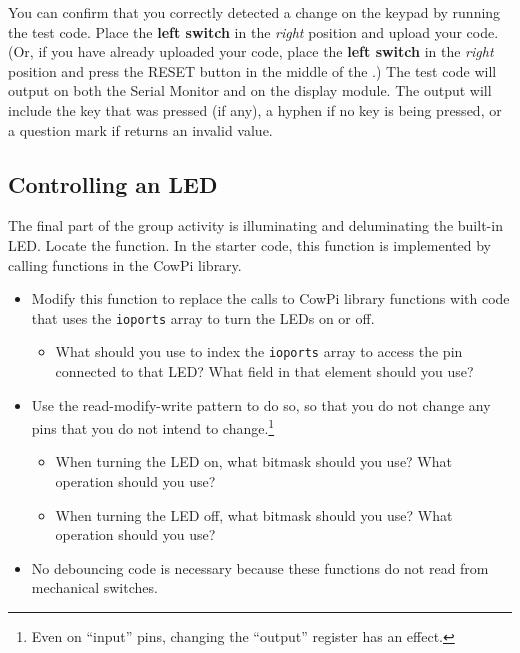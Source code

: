 You can confirm that you correctly detected a change on the keypad by running the test code.
Place the \textbf{left switch} in the \textit{right} position and upload your code.
(Or, if you have already uploaded your code, place the \textbf{left switch} in the \textit{right} position and press the RESET button in the middle of the \developmentboard.)
The test code will output on both the Serial Monitor and on the display module.
The output will include the key that was pressed (if any), a hyphen if no key is being pressed, or a question mark if  returns an invalid value.


\subsection{Controlling an LED}

The final part of the group activity is illuminating and deluminating the built-in LED\@.
Locate the  function.
In the starter code, this function is implemented by calling functions in the CowPi library.

\begin{itemize}
    \item Modify this function to replace the calls to CowPi library functions with code that uses the \lstinline{ioports} array to turn the LEDs on or off.
        \begin{itemize}
            \item What should you use to index the \lstinline{ioports} array to access the pin connected to that LED?
                What field in that element should you use?
        \end{itemize}
    \item Use the read-modify-write pattern to do so, so that you do not change any pins that you do not intend to change.\footnote{Even on ``input'' pins, changing the ``output'' register has an effect.}
    \begin{itemize}
        \item When turning the LED on, what bitmask should you use?
            What operation should you use?
        \item When turning the LED off, what bitmask should you use?
            What operation should you use?
    \end{itemize}
    \item No debouncing code is necessary because these functions do not read from mechanical switches.
\end{itemize}

